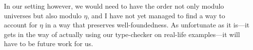 In our setting however, we would need to have the order not only modulo
universes but also modulo \(\eta\), and I have not yet managed to find a way
to account for \(\eta\) in a way that preserves well-foundedness.
As unfortunate as it is---it gets in the way of actually using our type-checker
on real-life examples---it will have to be future work for us.